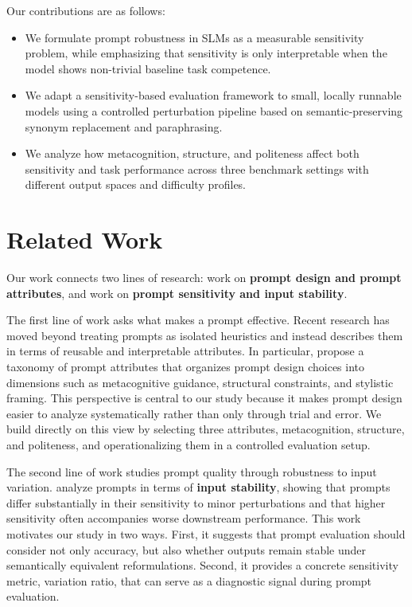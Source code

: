 \documentclass[11pt]{article}
\begin{document}
Our contributions are as follows:
\begin{itemize}
    \item We formulate prompt robustness in SLMs as a measurable sensitivity problem, while emphasizing that sensitivity is only interpretable when the model shows non-trivial baseline task competence.
    \item We adapt a sensitivity-based evaluation framework to small, locally runnable models using a controlled perturbation pipeline based on semantic-preserving synonym replacement and paraphrasing.
    \item We analyze how metacognition, structure, and politeness affect both sensitivity and task performance across three benchmark settings with different output spaces and difficulty profiles.
\end{itemize}

\section{Related Work}

Our work connects two lines of research: work on \textbf{prompt design and prompt attributes}, and work on \textbf{prompt sensitivity and input stability}.

The first line of work asks what makes a prompt effective. Recent research has moved beyond treating prompts as isolated heuristics and instead describes them in terms of reusable and interpretable attributes. In particular, \citet{long-etal-2025-makes} propose a taxonomy of prompt attributes that organizes prompt design choices into dimensions such as metacognitive guidance, structural constraints, and stylistic framing. This perspective is central to our study because it makes prompt design easier to analyze systematically rather than only through trial and error. We build directly on this view by selecting three attributes, metacognition, structure, and politeness, and operationalizing them in a controlled evaluation setup.

The second line of work studies prompt quality through robustness to input variation. \citet{lu-etal-2024-prompts} analyze prompts in terms of \textbf{input stability}, showing that prompts differ substantially in their sensitivity to minor perturbations and that higher sensitivity often accompanies worse downstream performance. This work motivates our study in two ways. First, it suggests that prompt evaluation should consider not only accuracy, but also whether outputs remain stable under semantically equivalent reformulations. Second, it provides a concrete sensitivity metric, variation ratio, that can serve as a diagnostic signal during prompt evaluation.
\end{document}
